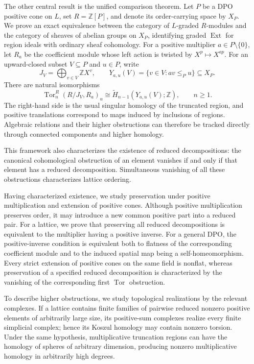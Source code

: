 \documentclass[10pt,letterpaper]{amsart}
\numberwithin{equation}{section}
\theoremstyle{definition}
\newcommand{\Z}{\mathbb Z}
\newcommand{\Tor}{\operatorname{Tor}}
\newcommand{\Ext}{\operatorname{Ext}}
\begin{document}
The other central result is the unified comparison theorem. Let $P$ be a DPO positive cone on $L$, set $R=\Z[P]$, and denote its order-carrying space by $X_P$. We prove an exact equivalence between the category of $L$-graded $R$-modules and the category of sheaves of abelian groups on $X_P$, identifying graded $\Ext$ for region ideals with ordinary sheaf cohomology. For a positive multiplier $a\in P\setminus\{0\}$, let $R_a$ be the coefficient module whose left action is twisted by $X^p\mapsto X^{ap}$. For an upward-closed subset $V\subseteq P$ and $u\in P$, write
\[
J_V=\bigoplus_{v\in V}\Z X^v,\qquad
Y_{a,u}(V)=\{v\in V:av\le_Pu\}\subseteq X_P.
\]
There are natural isomorphisms
\[
\Tor_n^R(R/J_V,R_a)_u
\cong\widetilde H_{n-1}\!\left(Y_{a,u}(V);\Z\right),\qquad n\ge1.
\]
The right-hand side is the usual singular homology of the truncated region, and positive translations correspond to maps induced by inclusions of regions. Algebraic relations and their higher obstructions can therefore be tracked directly through connected components and higher homology.

This framework also characterizes the existence of reduced decompositions: the canonical cohomological obstruction of an element vanishes if and only if that element has a reduced decomposition. Simultaneous vanishing of all these obstructions characterizes lattice ordering.

Having characterized existence, we study preservation under positive multiplication and extension of positive cones. Although positive multiplication preserves order, it may introduce a new common positive part into a reduced pair. For a lattice, we prove that preserving all reduced decompositions is equivalent to the multiplier having a positive inverse. For a general DPO, the positive-inverse condition is equivalent both to flatness of the corresponding coefficient module and to the induced spatial map being a self-homeomorphism. Every strict extension of positive cones on the same field is nonflat, whereas preservation of a specified reduced decomposition is characterized by the vanishing of the corresponding first $\Tor$ obstruction.

To describe higher obstructions, we study topological realizations by the relevant complexes. If a lattice contains finite families of pairwise reduced nonzero positive elements of arbitrarily large size, its positive-sum complexes realize every finite simplicial complex; hence its Koszul homology may contain nonzero torsion. Under the same hypothesis, multiplicative truncation regions can have the homology of spheres of arbitrary dimension, producing nonzero multiplicative homology in arbitrarily high degrees.
\end{document}
